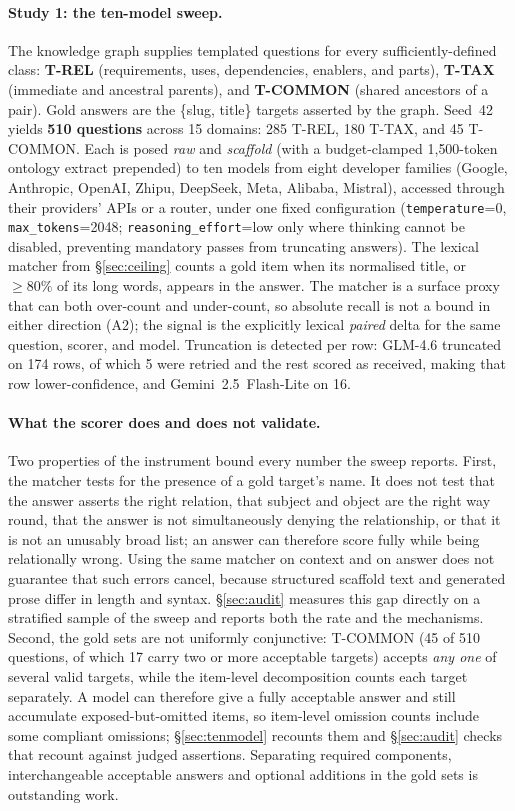 \documentclass[10pt,twocolumn]{article}
\begin{document}
\paragraph{Study 1: the ten-model sweep.} The knowledge graph supplies templated questions for every sufficiently-defined class: \textbf{T-REL} (requirements, uses, dependencies, enablers, and parts), \textbf{T-TAX} (immediate and ancestral parents), and \textbf{T-COMMON} (shared ancestors of a pair). Gold answers are the \{slug, title\} targets asserted by the graph. Seed~42 yields \textbf{510 questions} across 15 domains: 285 T-REL, 180 T-TAX, and 45 T-COMMON. Each is posed \emph{raw} and \emph{scaffold} (with a budget-clamped 1{,}500-token ontology extract prepended) to ten models from eight developer families (Google, Anthropic, OpenAI, Zhipu, DeepSeek, Meta, Alibaba, Mistral), accessed through their providers' APIs or a router, under one fixed configuration (\texttt{temperature}=0, \texttt{max\_tokens}=2048; \texttt{reasoning\_effort}=low only where thinking cannot be disabled, preventing mandatory passes from truncating answers). The lexical matcher from \S\ref{sec:ceiling} counts a gold item when its normalised title, or $\geq80\%$ of its long words, appears in the answer. The matcher is a surface proxy that can both over-count and under-count, so absolute recall is not a bound in either direction (A2); the signal is the explicitly lexical \emph{paired} delta for the same question, scorer, and model. Truncation is detected per row: GLM-4.6 truncated on 174 rows, of which 5 were retried and the rest scored as received, making that row lower-confidence, and Gemini~2.5~Flash-Lite on 16.

\paragraph{What the scorer does and does not validate.} Two properties of the instrument bound every number the sweep reports. First, the matcher tests for the presence of a gold target's name. It does not test that the answer asserts the right relation, that subject and object are the right way round, that the answer is not simultaneously denying the relationship, or that it is not an unusably broad list; an answer can therefore score fully while being relationally wrong. Using the same matcher on context and on answer does not guarantee that such errors cancel, because structured scaffold text and generated prose differ in length and syntax. \S\ref{sec:audit} measures this gap directly on a stratified sample of the sweep and reports both the rate and the mechanisms. Second, the gold sets are not uniformly conjunctive: T-COMMON (45 of 510 questions, of which 17 carry two or more acceptable targets) accepts \emph{any one} of several valid targets, while the item-level decomposition counts each target separately. A model can therefore give a fully acceptable answer and still accumulate exposed-but-omitted items, so item-level omission counts include some compliant omissions; \S\ref{sec:tenmodel} recounts them and \S\ref{sec:audit} checks that recount against judged assertions. Separating required components, interchangeable acceptable answers and optional additions in the gold sets is outstanding work.
\end{document}
